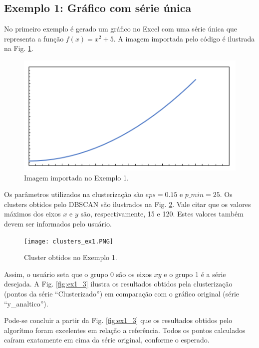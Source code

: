 \documentclass{article}
\begin{document}
    \subsection{Exemplo 1: Gráfico com série única}    
    
    No primeiro exemplo é gerado um gráfico no Excel com uma série única que representa a função $f(x)=x^2+5$. A imagem importada pelo código é ilustrada na Fig. \ref{fig:ex1_1}. 
    
    \begin{figure}[h]
        \centering
        \includegraphics[scale=0.5]{t2.PNG}
        \caption{Imagem importada no Exemplo 1.}
        \label{fig:ex1_1}
    \end{figure}
    
    Os parâmetros utilizados na clusterização são $eps=0.15$ e $p\_min=25$. Os clusters obtidos pelo DBSCAN são ilustrados na Fig. \ref{fig:ex1_2}. Vale citar que os valores máximos dos eixos $x$ e $y$ são, respectivamente, 15 e 120. Estes valores também devem ser informados pelo usuário.
    
    \begin{figure}[h]
        \centering
        \texttt{[image: clusters\_ex1.PNG]}
        \caption{Cluster obtidos no Exemplo 1.}
        \label{fig:ex1_2}
    \end{figure}
    
    Assim, o usuário seta que o grupo 0 são os eixos $xy$ e o grupo 1 é a série desejada. A Fig. \ref{fig:ex1_3} ilustra os resultados obtidos pela clusterização (pontos da série ``Clusterizado'') em comparação com o gráfico original (série ``y\_analtico'').
    
    Pode-se concluir a partir da Fig. \ref{fig:ex1_3} que os resultados obtidos pelo algorítmo foram excelentes em relação a referência. Todos os pontos calculados caíram exatamente em cima da série original, conforme o esperado.
    
\end{document}
